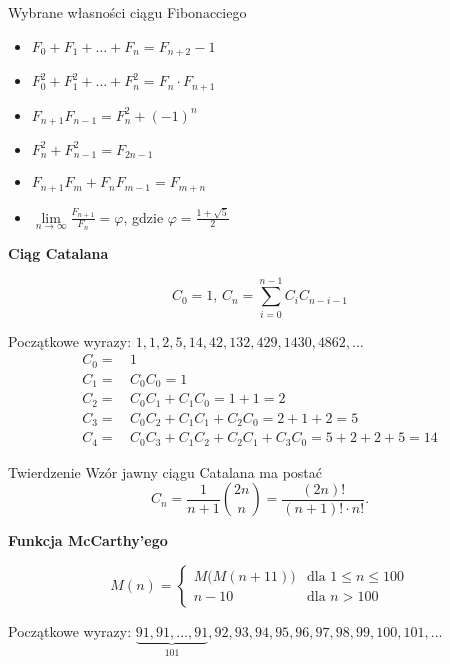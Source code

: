 \documentclass[a4paper,10pt]{beamer}
\begin{document}
\begin{frame}

\begin{block}{Wybrane własności ciągu Fibonacciego}

\begin{itemize}
\item $F_0+F_1+\ldots+F_n=F_{n+2}-1$
\item $F_0^2+F_1^2+\ldots+F_n^2=F_n\cdot F_{n+1}$
\item $F_{n+1}F_{n-1}=F_n^2+(-1)^n$
\item $F_n^2+F_{n-1}^2=F_{2n-1}$
\item $F_{n+1}F_m+F_nF_{m-1}=F_{m+n}$
\item $\lim\limits_{n\to\infty}\frac{F_{n+1}}{F_n}=\varphi$, gdzie $\varphi=\frac{1+\sqrt5}{2}$
\end{itemize}
\end{block}

\end{frame}




\begin{frame}

{\bf Ciąg Catalana}
		
	$$C_0=1,\,C_n=\sum\limits_{i=0}^{n-1}C_iC_{n-i-1}$$

Początkowe wyrazy: $1, 1, 2, 5, 14, 42, 132, 429, 1430, 4862,\ldots$
\begin{align*}
C_0=&\,1\\
C_1=&\,C_0C_0=1\\
C_2=&\,C_0C_1+C_1C_0=1+1=2\\
C_3=&\,C_0C_2+C_1C_1+C_2C_0=2+1+2=5\\
C_4=&\,C_0C_3+C_1C_2+C_2C_1+C_3C_0=5+2+2+5=14
\end{align*}

\begin{block}{Twierdzenie}
Wzór jawny ciągu Catalana ma postać
$$C_n=\frac1{n+1}{2n\choose n}=\frac{(2n)!}{(n+1)!\cdot n!}.$$
\end{block}

\end{frame}




\begin{frame}

{\bf Funkcja McCarthy'ego}
	
	$$M(n)=\left\{\begin{array}{ll}M\big(M(n+11)\big)&\mbox{dla }1\leqslant n\leqslant100\\n-10&\mbox{dla }n>100\end{array}\right.$$

Początkowe wyrazy: $\underbrace{91,91,\ldots,91}_{101},92,93,94,95,96,97,98,99,100,101,\ldots$

\end{frame}
\end{document}
